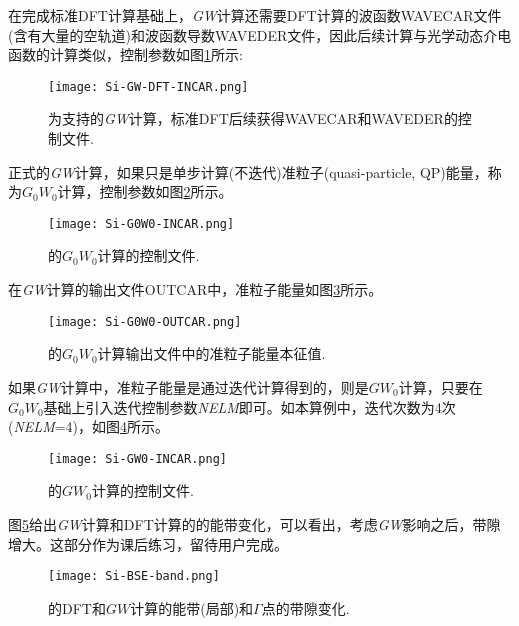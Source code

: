 在完成标准\textrm{DFT}计算基础上，\textit{GW}计算还需要\textrm{DFT}计算的波函数\textrm{WAVECAR文件(含有大量的空轨道)}和波函数导数\textrm{WAVEDER}文件，因此后续计算与光学动态介电函数的计算类似，控制参数如图\ref{Si-GW-DFT-INCAR}所示:
\begin{figure}[h!]
\centering
\texttt{[image: Si-GW-DFT-INCAR.png]}
\caption{\small \textrm{为支持的\textit{GW}计算，标准\textrm{DFT}后续获得\textrm{WAVECAR}和\textrm{WAVEDER}的控制文件.}}%
\label{Si-GW-DFT-INCAR}
\end{figure}

正式的\textit{GW}计算，如果只是单步计算(不迭代)准粒子(\textrm{quasi-particle, QP})能量，称为$G_0W_0$计算，控制参数如图\ref{Si-G0W0-INCAR}所示。
\begin{figure}[h!]
\centering
\texttt{[image: Si-G0W0-INCAR.png]}
\caption{\small \textrm{的$G_0W_0$计算的控制文件.}}%
\label{Si-G0W0-INCAR}
\end{figure}
在\textit{GW}计算的输出文件\textrm{OUTCAR}中，准粒子能量如图\ref{Si-G0W0-OUTCAR}所示。
\begin{figure}[h!]
\centering
\texttt{[image: Si-G0W0-OUTCAR.png]}
\caption{\small \textrm{的$G_0W_0$计算输出文件中的准粒子能量本征值.}}%
\label{Si-G0W0-OUTCAR}
\end{figure}

如果\textit{GW}计算中，准粒子能量是通过迭代计算得到的，则是$GW_0$计算，只要在$G_0W_0$基础上引入迭代控制参数\textit{NELM}即可。如本算例中，迭代次数为4次(\textit{NELM}=4)，如图\ref{Si-GW0-INCAR}所示。
\begin{figure}[h!]
\centering
\texttt{[image: Si-GW0-INCAR.png]}
\caption{\small \textrm{的$GW_0$计算的控制文件.}}%
\label{Si-GW0-INCAR}
\end{figure}

图\ref{Si-GW-Band}给出\textit{GW}计算和\textrm{DFT}计算的的能带变化，可以看出，考虑\textit{GW}影响之后，带隙增大。这部分作为课后练习，留待用户完成。
\begin{figure}[h!]
\centering
\texttt{[image: Si-BSE-band.png]}
\caption{\small \textrm{的\textrm{DFT}和$GW$计算的能带(局部)和$\Gamma$点的带隙变化.}}%
\label{Si-GW-Band}
\end{figure}


